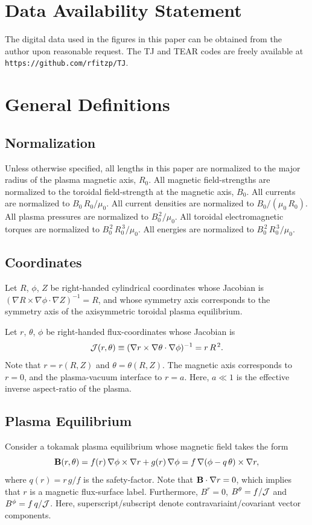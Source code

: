 \documentclass[12pt,prb,aps]{revtex4-1}
\begin{document}
\section*{Data Availability Statement}
The digital data used in the figures in this paper can be obtained from the author upon reasonable request. The TJ and TEAR codes are freely 
available at {\tt https://github.com/rfitzp/TJ}. 

\appendix

\section{General Definitions}
\subsection{Normalization}\label{norm}
Unless otherwise specified, all lengths in this paper are normalized to  the major radius of the plasma magnetic axis, $R_0$. All magnetic field-strengths
are normalized to the  toroidal field-strength at the magnetic axis, $B_0$. All currents are normalized to $B_0\,R_0/\mu_0$. All current densities are normalized to $B_0/(\mu_0\,R_0)$.  All plasma pressures are normalized to $B_0^{\,2}/\mu_0$.
All toroidal electromagnetic torques are normalized to $B_0^{\,2}\,R_0^{\,3}/\mu_0$. All energies are normalized to $B_0^{\,2}\,R_0^{\,3}/\mu_0$. 

\subsection{Coordinates}\label{coord}
Let $R$, $\phi$, $Z$ be right-handed cylindrical coordinates whose Jacobian 
is $ (\nabla R\times \nabla\phi\cdot\nabla Z)^{-1} = R$, 
and whose symmetry axis corresponds to the symmetry axis of the axisymmetric toroidal plasma equilibrium. 

Let $r$, $\theta$, $\phi$ be right-handed flux-coordinates whose
Jacobian is
\begin{equation}\label{jac}
{\cal J}(r,\theta)\equiv (\nabla r\times \nabla\theta\cdot\nabla\phi)^{-1}= r\,R^{\,2}.
\end{equation}
Note that $r=r(R,Z)$ and $\theta=\theta(R,Z)$. 
The magnetic axis corresponds to $r=0$, and the plasma-vacuum interface to $r=a$. Here, $a\ll 1$ is the effective inverse aspect-ratio of the plasma. 

\subsection{Plasma Equilibrium}\label{equilb}
Consider a tokamak plasma equilibrium whose magnetic field takes the form
\begin{equation}
{\bf B}(r,\theta) = f(r)\,\nabla\phi\times \nabla r + g(r)\,\nabla\phi = f\,\nabla(\phi-q\,\theta)\times \nabla r,
\end{equation}
where
$q(r) = r\,g/f$ is the safety-factor. Note that ${\bf B}\cdot\nabla r=0$, which implies that $r$ is a magnetic flux-surface label.
Furthermore,   $B^r=0$, $B^\theta= f/{\cal J}$ and  $B^\phi =f\,q/{\cal J}$. Here, superscript/subscript denote contravariaint/covariant
vector components. 
\end{document}
